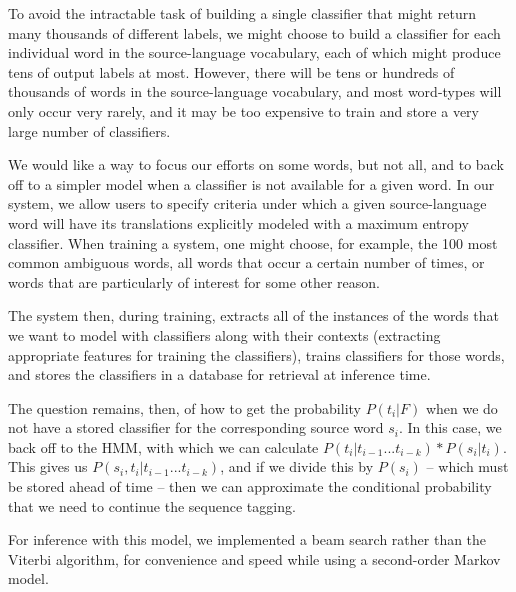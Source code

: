 \documentclass[11pt]{article}
\begin{document}
To avoid the intractable task of building a single classifier that might return
many thousands of different labels, we might choose to build a classifier for
each individual word in the source-language vocabulary, each of which might
produce tens of output labels at most. However, there will be tens or hundreds
of thousands of words in the source-language vocabulary, and most word-types
will only occur very rarely, and it may be too expensive to train and store a
very large number of classifiers.

We would like a way to focus our efforts on some words, but not all, and to
back off to a simpler model when a classifier is not available for a given
word. In our system, we allow users to specify criteria under which a given
source-language word will have its translations explicitly modeled with a
maximum entropy classifier. When training a system, one might choose, for
example, the 100 most common ambiguous words, all words that occur a certain
number of times, or words that are particularly of interest for some other
reason.

The system then, during training, extracts all of the instances of the words
that we want to model with classifiers along with their contexts (extracting
appropriate features for training the classifiers), trains classifiers for
those words, and stores the classifiers in a database for retrieval at
inference time.

The question remains, then, of how to get the probability $P(t_i | F)$ when we
do not have a stored classifier for the corresponding source word $s_i$. In
this case, we back off to the HMM, with which we can calculate $P(t_i |
t_{i-1}...t_{i-k}) * P(s_i | t_i)$. This gives us $P(s_i, t_i |
t_{i-1}...t_{i-k})$, and if we divide this by $P(s_i)$ -- which must be stored
ahead of time -- then we can approximate the conditional probability that we
need to continue the sequence tagging.

For inference with this model, we implemented a beam search rather than the
Viterbi algorithm, for convenience and speed while using a second-order Markov
model.
\end{document}

